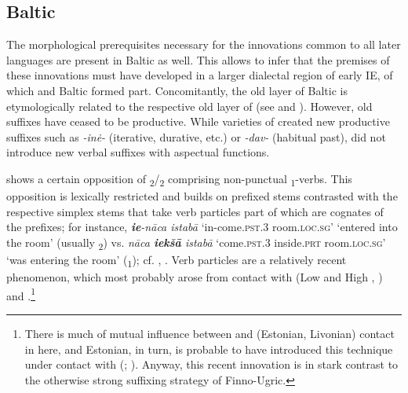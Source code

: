 \documentclass[output=paper]{langsci/langscibook}
\begin{document}
\subsection{Baltic}\label{sec:wiemerserzant:5.4}

The morphological prerequisites necessary for the innovations common to all later  languages are present in Baltic as well. This allows to infer that the premises of these innovations must have developed in a larger dialectal region of early IE, of which  and Baltic formed part. Concomitantly, the old layer of Baltic  is etymologically related to the respective old layer of  (see  and ). However, old suffixes have ceased to be productive. While varieties of  created new productive suffixes such as \textit{-in\.e-} (iterative, durative, etc.) or \textit{-dav-} (habitual past),  did not introduce new verbal suffixes with aspectual functions.

 shows a certain opposition of \textsubscript{2}/\textsubscript{2}  comprising non-punctual \textsubscript{1}-verbs. This opposition is lexically restricted and builds on prefixed stems contrasted with the respective simplex stems that take verb particles part of which are cognates of the prefixes; for instance,
\textit{\textbf{ie}-nāca istabā} 
‘in-come.\textsc{pst.3} room.\textsc{loc.sg}’ 
‘entered into the room’ (usually \textsubscript{2}) 
vs. 
\textit{nāca \textbf{iekšā} istabā} 
‘come.\textsc{pst.3} inside.\textsc{prt} room.\textsc{loc.sg}’ 
‘was entering the room’ (\textsubscript{1}); cf. \citet[132–141]{Holvoet2001}, \citet[132–134]{Arkadiev2015}. Verb particles are a relatively recent phenomenon, which most probably arose from contact with  (Low and High , ) and  \citep{Wälchli2001}.\footnote{There is much of mutual influence between  and  (Estonian, Livonian) contact in here, and Estonian, in turn, is probable to have introduced this technique under contact with  (\citealt{Hasselblatt1990}; \citealt{Metslang2001}). Anyway, this recent innovation is in stark contrast to the otherwise strong suffixing strategy of Finno-Ugric.}
\end{document}

